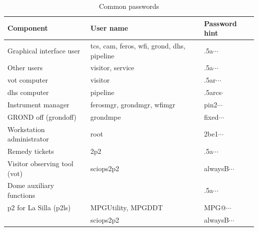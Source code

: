 \documentclass[11pt,fleqn,a4paper]{book}
\begin{document}
\begin{table}
\caption{Common passwords}
\label{tab:pwd}
\centering
\begin{tabular}{lll}
\hline
Component                    &  User name                                            & Password hint\\
\hline\hline
Graphical interface user     & tcs, cam, feros, wfi, grond, dhs, pipeline & .5a$\cdots$\\
Other users                  & \gls{visitor}, \gls{service}               & .5a$\cdots$\\
vot computer                 & \gls{visitor}                              & .5ar$\cdots$\\
dhs computer                 & pipeline                                   & .5arcs$\cdot$\\
Instrument manager           & ferosmgr, grondmgr, wfimgr                 & pin2$\cdots$\\
GROND off (grondoff)         & grondmpe                                   & fixed$\cdots$\\
Workstation administrator    & root                                       & 2be1$\cdots$\\
Remedy tickets               & 2p2                                        & .5a$\cdots$\\
Visitor observing tool (vot) & sciops2p2                                  & alwaysB$\cdots$\\
Dome auxiliary functions     &                                            & .5a$\cdots$\\
p2 for La Silla (p2ls)       & MPGUtility, MPGDDT                         & MPG@$\cdots$\\
                             & sciops2p2                                  & alwaysB$\cdots$\\
\hline
\end{tabular}
\end{table}
\end{document}
